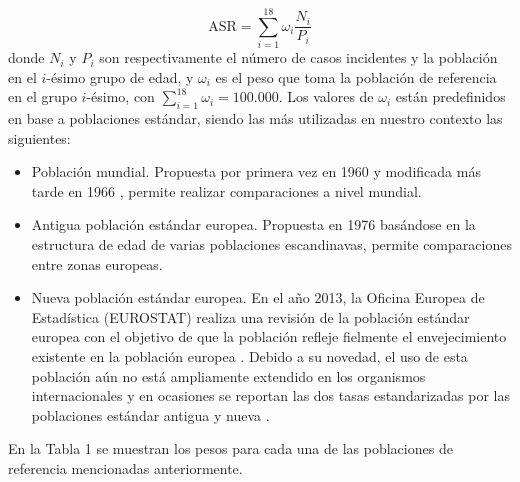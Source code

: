 $$\text{ASR} = \sum_{i = 1}^{18} \omega_i \dfrac{N_i}{P_i} $$
donde $N_i$ y $P_i$ son respectivamente el número de casos incidentes y la población en el $i$-ésimo grupo de edad, y $\omega_i$ es el peso que toma la población de referencia en el grupo $i$-ésimo, con $\sum_{i = 1}^{18}\omega_i = 100.000$. Los valores de ${\omega_i}$ están predefinidos en base a poblaciones estándar, siendo las más utilizadas en nuestro contexto las siguientes:

\begin{itemize}
	
	\item Población mundial. Propuesta por primera vez en 1960 \cite{SegiM.1960} y modificada más tarde en 1966 \cite{Doll1966}, permite realizar comparaciones a nivel mundial.
		
	\item Antigua población estándar europea. Propuesta en 1976 \cite{Waterhouse1976} basándose en la estructura de edad de varias poblaciones escandinavas, permite comparaciones entre zonas europeas.
	
	\item Nueva población estándar europea. En el año 2013, la Oficina Europea de Estadística (EUROSTAT) realiza una revisión de la población estándar europea con el objetivo de que la población refleje fielmente el envejecimiento existente en la población europea \cite{EUROSTAT2013}. Debido a su novedad, el uso de esta población aún no está ampliamente extendido en los organismos internacionales \cite{ECIS2} y en ocasiones se reportan las dos tasas estandarizadas por las poblaciones estándar antigua y nueva \cite{ECIS}.
	

\end{itemize}

En la Tabla 1 se muestran los pesos para cada una de las poblaciones de referencia mencionadas anteriormente.\\


